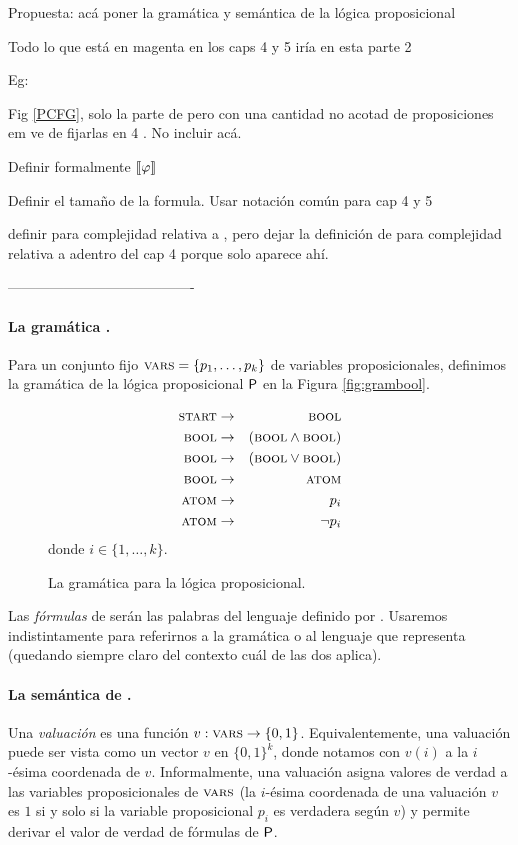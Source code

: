 

    \color{magenta}
    Propuesta: acá poner la gramática y semántica de la lógica proposicional

    Todo lo que está en magenta en los caps 4 y 5 iría en esta parte 2

    Eg:
    
    Fig \ref{PCFG}, solo la parte de \grambool pero con una cantidad no acotad de proposiciones em ve de fijarlas en 4 . No incluir \gramboolxor acá.

    Definir formalmente $\llbracket \varphi\rrbracket$

    Definir el tamaño de la formula. Usar notación común para cap 4 y 5

    definir  \mdlbool para complejidad relativa a \grambool, pero dejar la definición de
      \mdlboolxor para complejidad relativa a \gramboolxor adentro del cap 4 porque solo aparece ahí. 

\color{black}

----------------------------------------

\paragraph{La gramática \grambool.}
Para un conjunto fijo $\textsc{vars}=\{p_1,\dots,p_k\}$ de variables proposicionales, definimos la gramática de la lógica proposicional ${\sf P}$ en la Figura \ref{fig:grambool}.
%
\begin{figure}
\begin{eqnarray*}
\textsc{start} &\to&\textsc{bool}\\
\textsc{bool} &\to&(\textsc{bool} \wedge \textsc{bool}) \\
\textsc{bool} &\to&(\textsc{bool} \vee \textsc{bool}) \\
\textsc{bool} &\to&\textsc{atom}\\
\textsc{atom} &\to& p_i \\
\textsc{atom} &\to&\lnot p_i 
\end{eqnarray*}
donde $i\in\{1,\dots,k\}$.
\caption{La gramática \grambool para la lógica proposicional.}
\end{figure}\label{fig:grambool}

Las {\em fórmulas} de \grambool serán las palabras del lenguaje definido por \grambool. Usaremos indistintamente \grambool para referirnos a la gramática o al lenguaje que representa (quedando siempre claro del contexto cuál de las dos aplica).


\paragraph{La semántica de \grambool.}
Una {\em valuación} es una función $v:\textsc{vars}\to\{0,1\}$. Equivalentemente, una valuación puede ser vista como un vector $v$ en $\{0,1\}^k$, donde notamos con $v(i)$ a la $i$-ésima coordenada de $v$. Informalmente, una valuación asigna valores de verdad a las variables proposicionales de $\textsc{vars}$ (la $i$-ésima coordenada de una valuación $v$ es $1$ si y solo si la variable proposicional $p_i$ es verdadera según $v$) y permite derivar el valor de verdad de fórmulas de ${\sf P}$.  

